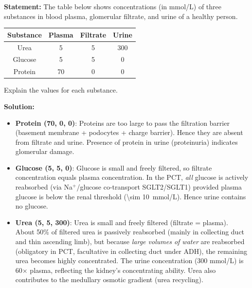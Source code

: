 \documentclass[11pt]{article}
\newcommand{\cle}[1]{{\popxbold\color{popdark}#1}}
\begin{document}
\begin{exoresolu}
\textbf{Statement:} The table below shows concentrations (in mmol/L) of three substances in blood plasma, glomerular filtrate, and urine of a healthy person.

\begin{center}
\begin{tabular}{|c|c|c|c|}\hline
\rowcolor{popblueL} Substance & Plasma & Filtrate & Urine \\ \hline
Urea & 5 & 5 & 300 \\ \hline
Glucose & 5 & 5 & 0 \\ \hline
Protein & 70 & 0 & 0 \\ \hline
\end{tabular}
\end{center}

Explain the values for each substance.

\textbf{Solution:}
\begin{itemize}
\item \textbf{Protein (70, 0, 0)}: Proteins are too large to pass the filtration barrier (basement membrane + podocytes + charge barrier). Hence they are absent from filtrate and urine. Presence of protein in urine (\cle{proteinuria}) indicates glomerular damage.
\item \textbf{Glucose (5, 5, 0)}: Glucose is small and freely filtered, so filtrate concentration equals plasma concentration. In the PCT, \emph{all} glucose is actively reabsorbed (via Na$^+$/glucose co-transport SGLT2/SGLT1) provided plasma glucose is below the renal threshold (\SI{\sim 10}{mmol/L}). Hence urine contains no glucose.
\item \textbf{Urea (5, 5, 300)}: Urea is small and freely filtered (filtrate = plasma). About 50\% of filtered urea is passively reabsorbed (mainly in collecting duct and thin ascending limb), but because \emph{large volumes of water} are reabsorbed (obligatory in PCT, facultative in collecting duct under ADH), the remaining urea becomes highly concentrated. The urine concentration (300 mmol/L) is 60$\times$ plasma, reflecting the kidney's concentrating ability. Urea also contributes to the medullary osmotic gradient (urea recycling).
\end{itemize}
\end{exoresolu}
\end{document}
